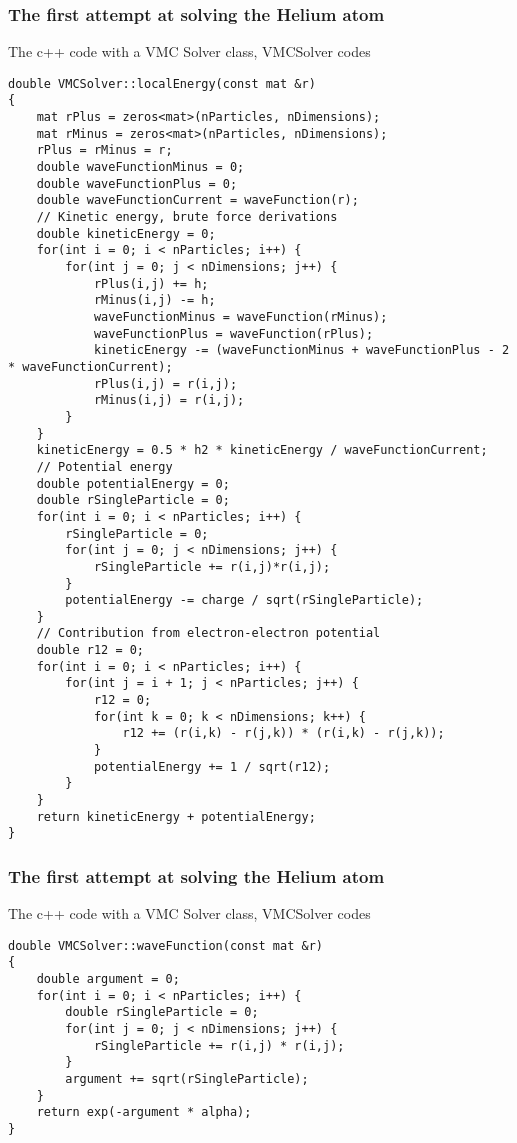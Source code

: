 \documentclass{beamer}
\begin{document}
\begin{frame}
\frametitle{The first attempt at solving the Helium atom}

\begin{block}{The c++ code with a VMC Solver class, VMCSolver codes }

\begin{verbatim}
double VMCSolver::localEnergy(const mat &r)
{
    mat rPlus = zeros<mat>(nParticles, nDimensions);
    mat rMinus = zeros<mat>(nParticles, nDimensions);
    rPlus = rMinus = r;
    double waveFunctionMinus = 0;
    double waveFunctionPlus = 0;
    double waveFunctionCurrent = waveFunction(r);
    // Kinetic energy, brute force derivations
    double kineticEnergy = 0;
    for(int i = 0; i < nParticles; i++) {
        for(int j = 0; j < nDimensions; j++) {
            rPlus(i,j) += h;
            rMinus(i,j) -= h;
            waveFunctionMinus = waveFunction(rMinus);
            waveFunctionPlus = waveFunction(rPlus);
            kineticEnergy -= (waveFunctionMinus + waveFunctionPlus - 2 * waveFunctionCurrent);
            rPlus(i,j) = r(i,j);
            rMinus(i,j) = r(i,j);
        }
    }
    kineticEnergy = 0.5 * h2 * kineticEnergy / waveFunctionCurrent;
    // Potential energy
    double potentialEnergy = 0;
    double rSingleParticle = 0;
    for(int i = 0; i < nParticles; i++) {
        rSingleParticle = 0;
        for(int j = 0; j < nDimensions; j++) {
            rSingleParticle += r(i,j)*r(i,j);
        }
        potentialEnergy -= charge / sqrt(rSingleParticle);
    }
    // Contribution from electron-electron potential
    double r12 = 0;
    for(int i = 0; i < nParticles; i++) {
        for(int j = i + 1; j < nParticles; j++) {
            r12 = 0;
            for(int k = 0; k < nDimensions; k++) {
                r12 += (r(i,k) - r(j,k)) * (r(i,k) - r(j,k));
            }
            potentialEnergy += 1 / sqrt(r12);
        }
    }
    return kineticEnergy + potentialEnergy;
}
\end{verbatim}
\end{block}
\end{frame}

\begin{frame}
\frametitle{The first attempt at solving the Helium atom}

\begin{block}{The c++ code with a VMC Solver class, VMCSolver codes }

\begin{verbatim}
double VMCSolver::waveFunction(const mat &r)
{
    double argument = 0;
    for(int i = 0; i < nParticles; i++) {
        double rSingleParticle = 0;
        for(int j = 0; j < nDimensions; j++) {
            rSingleParticle += r(i,j) * r(i,j);
        }
        argument += sqrt(rSingleParticle);
    }
    return exp(-argument * alpha);
}
\end{verbatim}
\end{block}
\end{frame}
\end{document}
